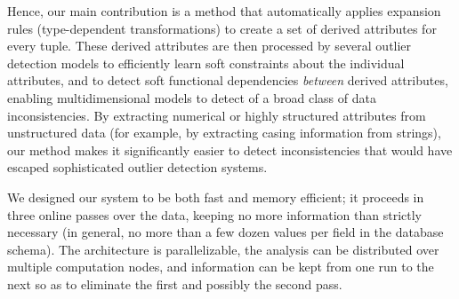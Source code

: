 Hence, our main contribution is a method that automatically applies expansion rules (type-dependent transformations) to create a set of derived attributes for every tuple. These derived attributes are then processed by several outlier detection models to efficiently learn soft constraints about the individual attributes, and to detect soft functional dependencies \textit{between} derived attributes, enabling multidimensional models to detect of a broad class of data inconsistencies. By extracting numerical or highly structured attributes from unstructured data (for example, by extracting casing information from strings), our method makes it significantly easier to detect inconsistencies that would have escaped sophisticated outlier detection systems.

We designed our system to be both fast and memory efficient; it proceeds in three online passes over the data, keeping no more information than strictly necessary (in general, no more than a few dozen values per field in the database schema). The architecture is parallelizable, the analysis can be distributed over multiple computation nodes, and information can be kept from one run to the next so as to eliminate the first and possibly the second pass.

